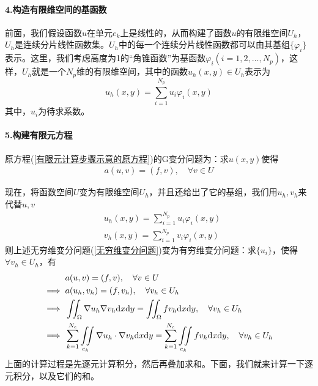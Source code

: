             \paragraph{4.构造有限维空间的基函数}
            前面，我们假设函数$u$在单元$e_k$上是线性的，从而构建了函数$u$的有限维空间$U_h$，$U_h$是连续分片线性函数集。$U_h$中的每一个连续分片线性函数都可以由其基组$\{\varphi_i\}$表示。这里，我们考虑高度为1的“角锥函数”为基函数$\varphi_i(i = 1,2,\dots,N_p)$，这样，$U_h$就是一个$N_p$维的有限维空间，其中的函数$u_h(x,y)\in U_h$表示为
            \[
                u_h(x,y) = \sum_{i = 1}^{N_p} u_i\varphi_i(x,y)
            \]
            其中，$u_i$为待求系数。
            \paragraph{5.构建有限元方程}
            原方程(\ref{有限元计算步骤示意的原方程})的G变分问题为：求$u(x,y)$使得
            \begin{align}
                \label{无穷维变分问题}
                a(u,v) = (f,v),\quad \forall v\in U
            \end{align}
            \par
            现在，将函数空间$U$变为有限维空间$U_h$，并且还给出了它的基组，我们用$u_h,v_h$来代替$u,v$
            \begin{align*}
                &u_h(x,y) = \sum_{i = 1}^{N_p} u_i\varphi_i(x,y)\\
                &v_h(x,y) = \sum_{i = 1}^{N_p} v_i\varphi_i(x,y)
            \end{align*}
            则上述无穷维变分问题(\ref{无穷维变分问题})变为有穷维变分问题：求$\{u_i\}$，使得$\forall v_h \in U_h$，有
            \begin{align}
                \label{有限元方程}
                &a(u,v) = (f,v),\quad \forall v\in U\notag\\
                \implies {} &a(u_h,v_h) = (f,v_h),\quad \forall v_h\in U_h \notag\\
                \implies {} &\iint_{\Omega} \nabla u_h \nabla v_h \mathrm{d}x\mathrm{d}y =
                \iint_{\Omega} f v_h \mathrm{d}x\mathrm{d}y ,\quad \forall v_h\in U_h\notag\\
                \implies {} &\sum _{k = 1}^{N_e} \iint\limits_{e_k} \nabla u_h \cdot \nabla v_h \mathrm{d}x\mathrm{d}y =
                \sum _{k = 1}^{N_e} \iint\limits_{e_k} f v_h \mathrm{d}x\mathrm{d}y ,\quad \forall v_h\in U_h
            \end{align}
            上面的计算过程是先逐元计算积分，然后再叠加求和。下面，我们就来计算一下逐元积分，以及它们的和。
